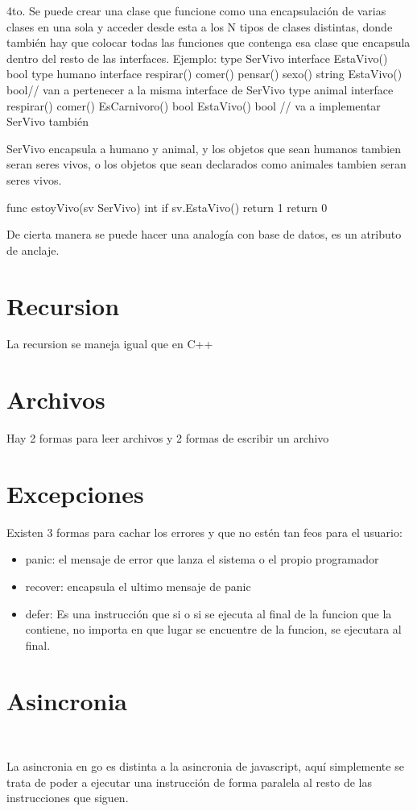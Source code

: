4to. Se puede crear una clase que funcione como una encapsulación de varias clases en una sola y acceder desde esta a los N tipos de clases distintas, donde también hay que colocar todas las funciones que contenga esa clase que encapsula dentro del resto de las interfaces.
Ejemplo:
type SerVivo interface{
	EstaVivo() bool 
}
type humano interface{
	respirar()
	comer()
	pensar()
	sexo() string
	EstaVivo() bool// van a pertenecer a la misma interface de SerVivo
}
type animal interface{
	respirar()
	comer()
	EsCarnivoro() bool
	EstaVivo() bool // va a implementar SerVivo también
}

SerVivo encapsula a humano y animal, y los objetos que sean humanos tambien seran seres vivos, o los objetos que sean declarados como animales tambien seran seres vivos. 

func estoyVivo(sv SerVivo) int {
	if sv.EstaVivo() {return 1}
	return 0
}

De cierta manera se puede hacer una analogía con base de datos, es un atributo de anclaje.

\section{Recursion}
\par La recursion se maneja igual que en C++

\section {Archivos}
\par Hay 2 formas para leer archivos y 2 formas de escribir un archivo

\section{Excepciones}
\par Existen 3 formas para cachar los errores y que no estén tan feos para el usuario:
\begin{itemize}
    \item panic: el mensaje de error que lanza el sistema o el propio programador
    \item recover: encapsula el ultimo mensaje de panic 
    \item defer: Es una instrucción que si o si se ejecuta al final de la funcion que la contiene, no importa en que lugar se encuentre de la funcion, se ejecutara al final.
\end{itemize}


\section{Asincronia}\
\par La asincronia en go es distinta a la asincronia de javascript, aquí simplemente se trata de poder a ejecutar una instrucción
de forma paralela al resto de las instrucciones que siguen.


\begin{example}
    
\end{example}








